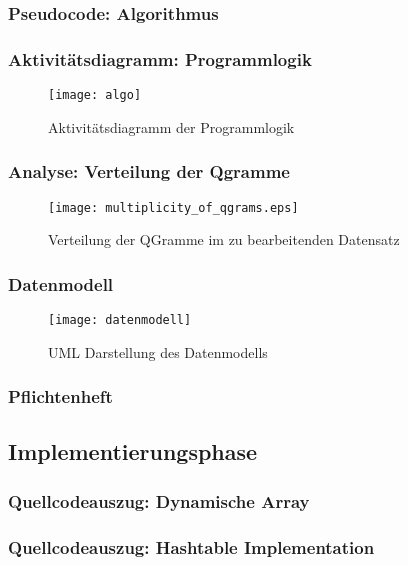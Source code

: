 \subsubsection{Pseudocode: Algorithmus}
\subsubsection{Aktivitätsdiagramm: Programmlogik}
\begin{figure}[!htp]
    \caption{Aktivitätsdiagramm der Programmlogik}
    \label{programmlogik}
    \texttt{[image: algo]}
    \centering
\end{figure}

\subsubsection{Analyse: Verteilung der Qgramme}
\begin{figure}[!htp]
    \caption{Verteilung der QGramme im zu bearbeitenden Datensatz}
    \label{fig:qgram_verteilung}
    \texttt{[image: multiplicity\_of\_qgrams.eps]}
    \centering
\end{figure}

\subsubsection{Datenmodell}
\begin{figure}[!htp]
    \caption{UML Darstellung des Datenmodells}
    \label{fig:datenmodell}
    \texttt{[image: datenmodell]}
    \centering
\end{figure}

\subsubsection{Pflichtenheft}

\subsection{Implementierungsphase}
\subsubsection{Quellcodeauszug: Dynamische Array}


\subsubsection{Quellcodeauszug: Hashtable Implementation}


